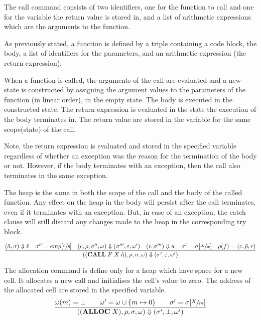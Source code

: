 The call command consists of two identifiers, one for the function to call and one for the variable the return value is stored in, and a list of arithmetic expressions which are the arguments to the function.

As previously stated, a function is defined by a triple containing a code block, the body, a list of identifiers for the parameters, and an arithmetic expression (the return expression).

When a function is called, the arguments of the call are evaluated and a new state is constructed by assigning the argument values to the parameters of the function (in linear order), in the empty state. The body is executed in the constructed state. The return expression is evaluated in the state the execution of the body terminates in. The return value are stored in the variable for the same scope(state) of the call.

Note, the return expression is evaluated and stored in the specified variable regardless of whether an exception was the reason for the termination of the body or not. However, if the body terminates with an exception, then the call also terminates in the same exception.

The heap is the same in both the scope of the call and the body of the called function. Any effect on the heap in the body will persist after the call terminates, even if it terminates with an exception. But, in case of an exception, the catch clause will still discard any changes made to the heap in the corresponding try block.

\begin{equation}\label{eqn:op-call}
\frac
{(\tilde{a},\sigma) \Downarrow \tilde{v} \quad \sigma''= emp[\sfrac{\tilde{v}}{\tilde{p}}] \quad (c, \rho, \sigma'', \omega) \Downarrow (\sigma''', \varepsilon, \omega') \quad (r,\sigma''') \Downarrow w \quad \sigma' = \sigma[\sfrac{X}{w}] \quad \rho(f) = (c, \tilde{p}, r)}
{((\textbf{CALL}\; F \; X  \; \tilde{a}), \rho, \sigma, \omega) \Downarrow (\sigma', \varepsilon, \omega')}
\end{equation}

The allocation command is define only for a heap which have space for a new cell. It allocates a new call and initialises the cell's value to zero. The address of the allocated cell are stored in the specified variable.
\begin{equation}
\frac
{\omega(m)=\bot \qquad \omega'=\omega\cup\{m \mapsto 0\} \qquad \sigma' = \sigma[\sfrac{X}{m}]}
{((\textbf{ALLOC}\;X), \rho, \sigma, \omega) \Downarrow (\sigma', \bot, \omega')}
\end{equation}


